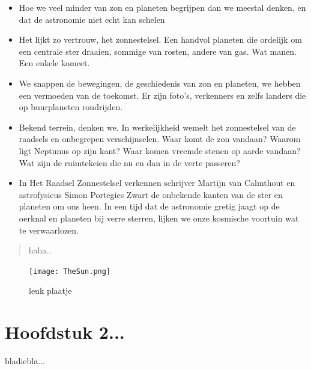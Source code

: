 \documentclass[11pt,fleqn]{book} %
\begin{document}
\begin{itemize}
  \item Hoe we veel minder van zon en planeten begrijpen dan we meestal denken, en dat de astronomie niet echt kan schelen

  \item   Het lijkt zo vertrouw, het zonnestelsel. Een handvol planeten die ordelijk om een centrale ster draaien, sommige van rosten, andere van gas. Wat manen. Een enkele komeet.

  \item   We snappen de bewegingen, de geschiedenis van zon en planeten, we hebben een vermoeden van de toekomst. Er zijn foto’s, verkenners en zelfs landers die op buurplaneten rondrijden.

  \item   Bekend terrein, denken we. In werkelijkheid wemelt het zonnestelsel van de raadsels en onbegrepen verschijnselen. Waar komt de zon vandaan? Waarom ligt Neptunus op zijn kant? Waar komen vreemde stenen op aarde vandaan? Wat zijn de ruimtekeien die nu en dan in de verte passeren?

  \item   In Het Raadsel Zonnestelsel verkennen schrijver Martijn van Calmthout en astrofysicus Simon Portegies Zwart de onbekende kanten van de ster en planeten om ons heen. In een tijd dat de astronomie gretig jaagt op de oerknal en planeten bij verre sterren, lijken we onze kosmische voortuin wat te verwaarlozen.
\end{itemize}
  

\begin{quote}
haha..
\end{quote}

\begin{figure}[h]
    \centering
    \texttt{[image: TheSun.png]}
    \caption{leuk plaatje}
    \label{fig:pca}
\end{figure}




\chapter{Hoofdstuk 2...}

bladiebla...
\end{document}
